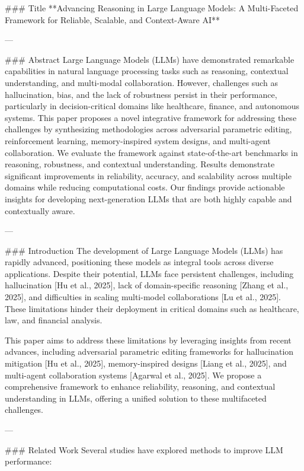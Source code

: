 ### Title  
**Advancing Reasoning in Large Language Models: A Multi-Faceted Framework for Reliable, Scalable, and Context-Aware AI**

---

### Abstract  
Large Language Models (LLMs) have demonstrated remarkable capabilities in natural language processing tasks such as reasoning, contextual understanding, and multi-modal collaboration. However, challenges such as hallucination, bias, and the lack of robustness persist in their performance, particularly in decision-critical domains like healthcare, finance, and autonomous systems. This paper proposes a novel integrative framework for addressing these challenges by synthesizing methodologies across adversarial parametric editing, reinforcement learning, memory-inspired system designs, and multi-agent collaboration. We evaluate the framework against state-of-the-art benchmarks in reasoning, robustness, and contextual understanding. Results demonstrate significant improvements in reliability, accuracy, and scalability across multiple domains while reducing computational costs. Our findings provide actionable insights for developing next-generation LLMs that are both highly capable and contextually aware.

---

### Introduction  
The development of Large Language Models (LLMs) has rapidly advanced, positioning these models as integral tools across diverse applications. Despite their potential, LLMs face persistent challenges, including hallucination [Hu et al., 2025], lack of domain-specific reasoning [Zhang et al., 2025], and difficulties in scaling multi-model collaborations [Lu et al., 2025]. These limitations hinder their deployment in critical domains such as healthcare, law, and financial analysis. 

This paper aims to address these limitations by leveraging insights from recent advances, including adversarial parametric editing frameworks for hallucination mitigation [Hu et al., 2025], memory-inspired designs [Liang et al., 2025], and multi-agent collaboration systems [Agarwal et al., 2025]. We propose a comprehensive framework to enhance reliability, reasoning, and contextual understanding in LLMs, offering a unified solution to these multifaceted challenges.

---

### Related Work  
Several studies have explored methods to improve LLM performance:  

